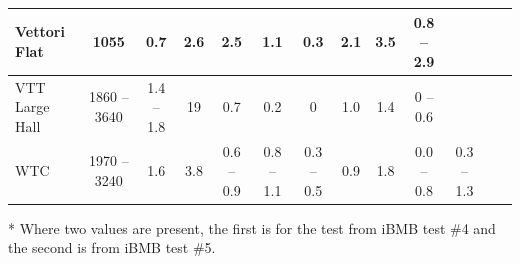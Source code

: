 \begin{table}
\begin{center}
\begin{tabular}{|l|c|c|c|c|c|c|c|c|c|c|c|c|}
Vettori Flat                      & 1055                & 0.7             & 2.6     & 2.5                      & 1.1                            & 0.3               & 2.1                 & 3.5                & 0.8 -- 2.9                  &                                       \\ \hline
VTT Large Hall                 & 1860 -- 3640   & 1.4 -- 1.8    & 19     & 0.7                      & 0.2                             & 0                  & 1.0                 & 1.4                & 0 -- 0.6                      &                                    \\ \hline
WTC                               & 1970 -- 3240   & 1.6              & 3.8    & 0.6 -- 0.9             & 0.8 -- 1.1                  & 0.3 -- 0.5     & 0.9                  & 1.8               & 0.0 -- 0.8                   & 0.3 -- 1.3                    \\ \hline
\end{tabular}
\end{center}
* Where two values are present, the first is for the test from iBMB test \#4 and the second is from iBMB test \#5.
\label{Test_Parameters}
\nopagebreak
\end{table}




\noindent
